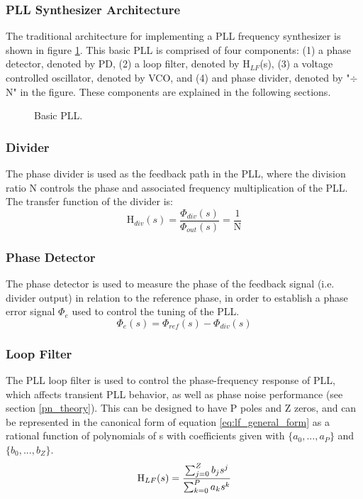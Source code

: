 		\subsubsection{PLL Synthesizer Architecture}
			The traditional architecture for implementing a PLL frequency synthesizer \cite{Razavi1996DesignOM} is shown in figure \ref{fig:basic_pll}. This basic PLL is comprised of four components: (1) a phase detector, denoted by PD, (2) a loop filter, denoted by H$_{LF}$(s), (3) a voltage controlled oscillator, denoted by VCO, and (4) and phase divider, denoted by "$\div$ N" in the figure. These components are explained in the following sections.
			\begin{figure}[htb!]
				\center
				\caption{Basic PLL.}
				\label{fig:basic_pll}
			\end{figure}
			\FloatBarrier

		\subsubsection{Divider}
			The phase divider is used as the feedback path in the PLL, where the division ratio N controls the phase and associated frequency multiplication of the PLL. The transfer function of the divider is:
			\begin{equation}
				\mathrm{H}_{div}(s) = \frac{\Phi_{div}(s)}{\Phi_{out}(s)} = \frac{1}{\mathrm{N}}
			\end{equation}

			\subsubsection{Phase Detector}
			The phase detector is used to measure the phase of the feedback signal (i.e. divider output) in relation to the reference phase, in order to establish a phase error signal $\Phi_e$ used to control the tuning of the PLL.
			\begin{equation}
				\Phi_e(s) = \Phi_{ref}(s) - \Phi_{div}(s)
			\end{equation}

		\subsubsection{Loop Filter}
			The PLL loop filter is used to control the phase-frequency response of PLL, which affects transient PLL behavior, as well as phase noise performance (see section \ref{pn_theory}). This can be designed to have P poles and Z zeros, and can be represented in the canonical form of equation \ref{eq:lf_general_form} as a rational function of polynomials of s with coefficients given with $\{a_0, ..., a_P\}$ and $\{b_0, ..., b_Z\}$.
			\begin{equation} \label{eq:lf_general_form}
				\textnormal{H}_{LF}(s) = \frac{\sum_{j=0}^Z b_js^j}{\sum_{k=0}^P a_ks^k}
			\end{equation}
			
